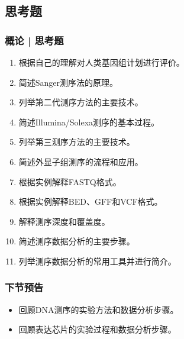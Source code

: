 \subsection{思考题}
\begin{frame}
  \frametitle{概论 | 思考题}
  \begin{enumerate}
    \item 根据自己的理解对人类基因组计划进行评价。
    \item 简述Sanger测序法的原理。
    \item 列举第二代测序方法的主要技术。
    \item 简述Illumina/Solexa测序的基本过程。
    \item 列举第三测序方法的主要技术。
    \item 简述外显子组测序的流程和应用。
    \item 根据实例解释FASTQ格式。
    \item 根据实例解释BED、GFF和VCF格式。
    \item 解释测序深度和覆盖度。
    \item 简述测序数据分析的主要步骤。
    \item 列举测序数据分析的常用工具并进行简介。
  \end{enumerate}
\end{frame}

\begin{frame}
  \frametitle{下节预告}
  \begin{itemize}
    \item 回顾DNA测序的实验方法和数据分析步骤。
    \item 回顾表达芯片的实验过程和数据分析步骤。
  \end{itemize}
\end{frame}




